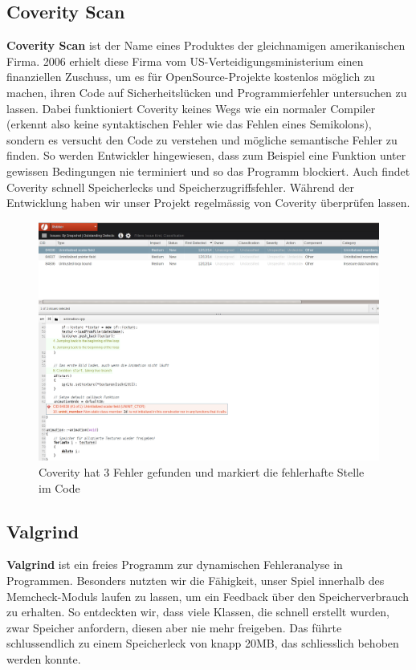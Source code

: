 \documentclass[12pt,a4paper]{scrartcl}
\begin{document}
\subsection{Coverity Scan}
\textbf{Coverity Scan} ist der Name eines Produktes der gleichnamigen amerikanischen Firma. 2006 erhielt diese Firma vom US-Verteidigungsministerium
einen finanziellen Zuschuss, um es für OpenSource-Projekte kostenlos möglich zu machen, ihren Code auf Sicherheitslücken und Programmierfehler untersuchen
zu lassen. Dabei funktioniert Coverity keines Wegs wie ein normaler Compiler (erkennt also keine syntaktischen Fehler wie das Fehlen eines Semikolons),
sondern es versucht den Code zu verstehen und mögliche semantische Fehler zu finden. So werden Entwickler hingewiesen, dass zum Beispiel eine Funktion
unter gewissen Bedingungen nie terminiert und so das Programm blockiert. Auch findet Coverity schnell Speicherlecks und Speicherzugriffsfehler.
Während der Entwicklung haben wir unser Projekt regelmässig von Coverity überprüfen lassen.
\begin{figure}
\centering
\includegraphics[scale=0.4]{img/coverity.png}
\caption{Coverity hat 3 Fehler gefunden und markiert die fehlerhafte Stelle im Code}
\end{figure}

\subsection{Valgrind}
\textbf{Valgrind} ist ein freies Programm zur dynamischen Fehleranalyse in Programmen. Besonders nutzten wir die Fähigkeit,
unser Spiel innerhalb des Memcheck-Moduls laufen zu lassen, um ein Feedback über den Speicherverbrauch zu erhalten. So entdeckten
wir, dass viele Klassen, die schnell erstellt wurden, zwar Speicher anfordern, diesen aber nie mehr freigeben. Das führte schlussendlich
zu einem Speicherleck von knapp 20MB,
 das schliesslich behoben werden konnte.
\end{document}
